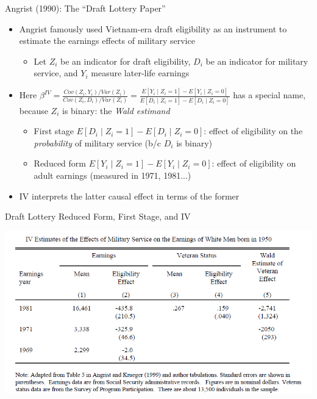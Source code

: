 \documentclass{beamer}
\begin{document}
\begin{frame}{Angrist (1990): The ``Draft Lottery Paper''}
\begin{itemize}
\item Angrist famously used Vietnam-era draft eligibility as an instrument to estimate the earnings effects of military service \smallskip
\begin{itemize}
\item Let $Z_i$ be an indicator for draft eligibility, $D_i$ be an indicator for military service, and $Y_i$ measure later-life earnings
\end{itemize}\medskip\pause{}
\item Here $\beta^{IV}=\frac{Cov(Z_i,Y_i)/Var(Z_i)}{Cov(Z_i,D_i)/Var(Z_i)}=\frac{E[Y_i\mid Z_i=1]-E[Y_i\mid Z_i=0]}{E[D_i\mid Z_i=1]-E[D_i\mid Z_i=0]}$ has a special name, because $Z_i$ is binary: the \emph{Wald estimand}\smallskip
\begin{itemize}
\item First stage $E[D_i\mid Z_i=1]-E[D_i\mid Z_i=0]$: effect of eligibility on the \emph{probability} of military service (b/c $D_i$ is binary)\smallskip
\item Reduced form $E[Y_i\mid Z_i=1]-E[Y_i\mid Z_i=0]$: effect of eligibility on adult earnings (measured in 1971, 1981...)
\end{itemize}\medskip\pause{}
\item IV interprets the latter causal effect in terms of the former
\end{itemize}
\end{frame}

\begin{frame}{Draft Lottery Reduced Form, First Stage, and IV}

\vspace{-0.7cm}
\begin{center}
\includegraphics[scale=0.55]{./lecture_includes/angrist_1990.png}
\end{center}

\end{frame}
\end{document}
